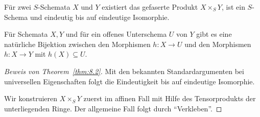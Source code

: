 \begin{thm}
\label{thm:8.2}
	Für zwei $S$-Schemata $X$ und $Y$ existiert das gefaserte Produkt $X \times_S Y$, ist ein $S$-Schema und eindeutig bis auf eindeutige Isomorphie.
\end{thm}

\begin{bem}
\label{bem:8.3}
	Für Schemata $X,Y$ und für ein offenes Unterschema $U$ von $Y$ gibt es eine natürliche Bijektion zwischen den Morphismen $h\colon X \to U$ und den Morphismen $h \colon X \to Y$ mit $h(X) \subseteq U$.
\end{bem}

\begin{proof}[Beweis von Theorem~\ref{thm:8.2}]
	Mit den bekannten Standardargumenten bei universellen Eigenschaften folgt die Eindeutigkeit bis auf eindeutige Isomorphie.

	Wir konstruieren $X \times_S Y$ zuerst im affinen Fall mit Hilfe des Tensorprodukts der unterliegenden Ringe. Der allgemeine Fall folgt durch \enquote{Verkleben}.


\end{proof}
